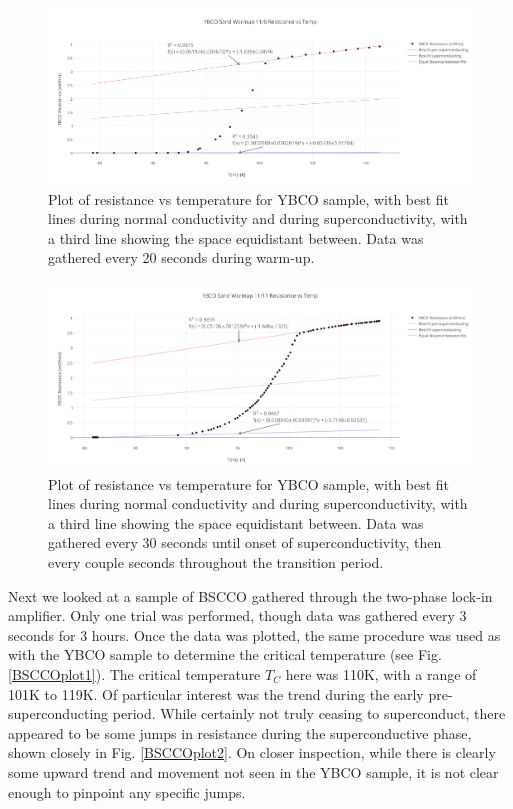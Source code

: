 \documentclass[prb,preprint]{revtex4-1}
\begin{document}
\begin{figure}[h!]
\centering
\includegraphics[width=7in]{ybco_sand_warmup_116_resistance_vs_temp.png}
\caption{Plot of resistance vs temperature for YBCO sample, with best fit lines during normal conductivity and during superconductivity, with a third line showing the space equidistant between. Data was gathered every 20 seconds during warm-up.}
\label{YBCOplot1}
\end{figure}

\begin{figure}[h!]
\centering
\includegraphics[width=7in]{ybco_sand_warmup_1111_resistance_vs_temp.png}
\caption{Plot of resistance vs temperature for YBCO sample, with best fit lines during normal conductivity and during superconductivity, with a third line showing the space equidistant between. Data was gathered every 30 seconds until onset of superconductivity, then every couple seconds throughout the transition period.}
\label{YBCOplot2}
\end{figure}

Next we looked at a sample of BSCCO gathered through the two-phase lock-in amplifier. Only one trial was performed, though data was gathered every 3 seconds for 3 hours. Once the data was plotted, the same procedure was used as with the YBCO sample to determine the critical temperature (see Fig. \ref{BSCCOplot1}). The critical temperature $T_C$ here was 110K, with a range of 101K to 119K. Of particular interest was the trend during the early pre-superconducting period. While certainly not truly ceasing to superconduct, there appeared to be some jumps in resistance during the superconductive phase, shown closely in Fig. \ref{BSCCOplot2}. On closer inspection, while there is clearly some upward trend and movement not seen in the YBCO sample, it is not clear enough to pinpoint any specific jumps.
\end{document}
